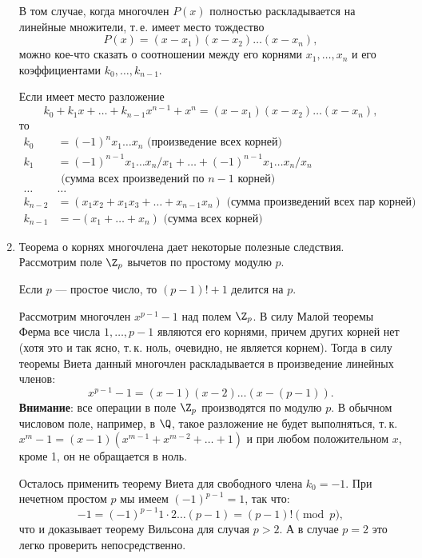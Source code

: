 \begin{enumerate}
В том случае, когда многочлен $P(x)$ полностью раскладывается на линейные множители, т.\,е. имеет место тождество
$$
P(x)= (x-x_1)(x-x_2)\dots(x-x_n),
$$
можно кое-что сказать о соотношении между его корнями $x_1,\dots,x_n$ и его коэффициентами $k_0,\dots,k_{n-1}$.
\begin{thrm}[Виет]
Если имеет место разложение
$$
k_0+k_1x+\dots+k_{n-1}x^{n-1}+x^n = (x-x_1)(x-x_2)\dots(x-x_n),
$$
то
\begin{align*}
k_0 & = (-1)^nx_1\dots x_n\mbox{  (произведение всех корней)} \\
k_1 & = (-1)^{n-1}x_1\dots x_n/x_1+\dots+(-1)^{n-1}x_1\dots x_n/x_n \\
    & \mbox{  (сумма всех произведений по\ $n-1$ корней)} \\
\dots & \dots \\
k_{n-2} & = (x_1x_2+x_1x_3+\dots + x_{n-1}x_n)\mbox{  (сумма произведений всех пар корней)} \\
k_{n-1} & = -(x_1+\dots+x_n) \mbox{  (сумма всех корней)}
\end{align*}
\end{thrm}

\item Теорема о корнях многочлена дает некоторые полезные следствия. Рассмотрим поле $\Z_p$ вычетов по простому модулю $p$.
\begin{thrm}[Вильсон]\label{Wilson}
Если $p$ --- простое число, то $(p-1)!+1$ делится на $p$.
\end{thrm}
\pf
Рассмотрим многочлен $x^{p-1}-1$ над полем $\Z_p$. В силу Малой теоремы Ферма все числа $1,\dots,p-1$ являются его корнями, причем других корней нет (хотя это и так ясно, т.\,к. ноль, очевидно, не является корнем). Тогда в силу теоремы Виета данный многочлен раскладывается в произведение линейных членов:
$$
x^{p-1}-1 = (x-1)(x-2)\dots (x-(p-1)).
$$
\textbf{Внимание}: все операции в поле $\Z_p$ производятся по модулю $p$. В обычном числовом поле, например, в $\Q$, такое разложение не будет выполняться, т.\,к. $x^m-1=(x-1)(x^{m-1}+x^{m-2}+\dots+1)$ и при любом положительном $x$, кроме 1, он не обращается в ноль.

Осталось применить теорему Виета для свободного члена $k_0=-1$. При нечетном простом $p$ мы имеем $(-1)^{p-1}=1$, так что:
$$
-1=(-1)^{p-1}1\cdot 2\dots(p-1)=(p-1)!\pmod p,
$$
что и доказывает теорему Вильсона для случая $p>2$. А в случае $p=2$ это легко проверить непосредственно.
\epf
\end{enumerate}







